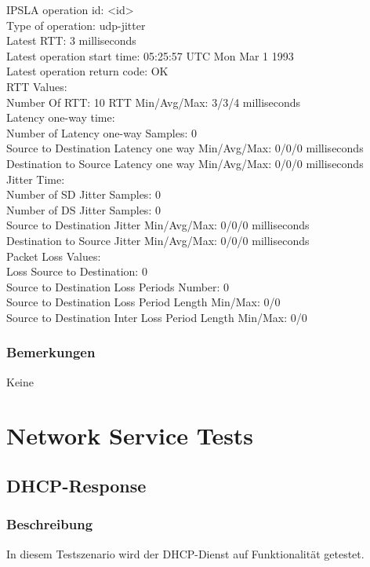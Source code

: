 \documentclass[a4,12pt]{scrartcl}
\begin{document}
\noindent IPSLA operation id: <id>\\
Type of operation: udp-jitter\\
        Latest RTT: 3 milliseconds\\
Latest operation start time: 05:25:57 UTC Mon Mar 1 1993\\
Latest operation return code: OK\\
RTT Values:\\
        Number Of RTT: 10               RTT Min/Avg/Max: 3/3/4 milliseconds\\
Latency one-way time:\\
        Number of Latency one-way Samples: 0\\
        Source to Destination Latency one way Min/Avg/Max: 0/0/0 milliseconds\\
        Destination to Source Latency one way Min/Avg/Max: 0/0/0 milliseconds\\
Jitter Time:\\
        Number of SD Jitter Samples: 0\\
        Number of DS Jitter Samples: 0\\
        Source to Destination Jitter Min/Avg/Max: 0/0/0 milliseconds\\
        Destination to Source Jitter Min/Avg/Max: 0/0/0 milliseconds\\
Packet Loss Values:\\
        Loss Source to Destination: 0\\
        Source to Destination Loss Periods Number: 0\\
        Source to Destination Loss Period Length Min/Max: 0/0\\
        Source to Destination Inter Loss Period Length Min/Max: 0/0\\
\subsubsection{Bemerkungen}
Keine

\newpage
\section{Network Service Tests}
\subsection{DHCP-Response}
\subsubsection{Beschreibung}
In diesem Testszenario wird der DHCP-Dienst auf Funktionalität getestet.
\end{document}
